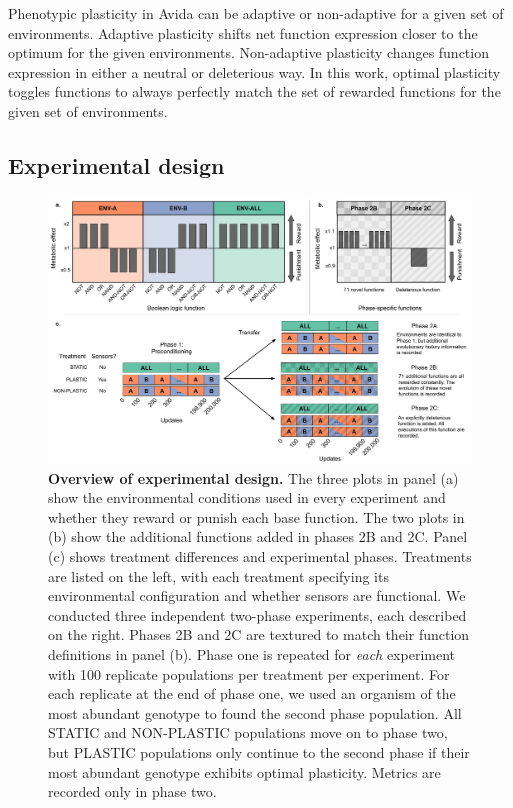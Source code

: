 \begin{raggedbottom}
Phenotypic plasticity in Avida can be adaptive or non-adaptive for a given set of environments.
Adaptive plasticity shifts net function expression closer to the optimum for the given environments.
Non-adaptive plasticity changes function expression in either a neutral or deleterious way.
In this work, optimal plasticity toggles functions to always perfectly match the set of rewarded functions for the given set of environments.

\subsection{Experimental design}
\label{sec:methods:experiment}

\begin{figure}[h!]
  \centering
  \includegraphics[width=1\textwidth]{05_consequences_of_plasticity/media/media-experimental-design.pdf}
  \caption{\small
  \textbf{Overview of experimental design.}
  The three plots in panel (a) show the environmental conditions used in every experiment and whether they reward or punish each base function.
  The two plots in (b) show the additional functions added in phases 2B and 2C. %
  Panel (c) shows treatment differences and experimental phases.
  Treatments are listed on the left, with each treatment specifying its environmental configuration and whether sensors are functional.
  We conducted three independent two-phase experiments, each described on the right.
  Phases 2B and 2C are textured to match their function definitions in panel (b).
  Phase one is repeated for \textit{each} experiment with 100 replicate populations per treatment per experiment.
  For each replicate at the end of phase one, we used an organism of the most abundant genotype to found the second phase population.
  All STATIC and NON-PLASTIC populations move on to phase two, but PLASTIC populations only continue to the second phase if their most abundant genotype exhibits optimal plasticity.
  Metrics are recorded only in phase two.
  }
  \label{fig:experimental-design}
\end{figure}


\end{raggedbottom}
